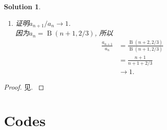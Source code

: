 \documentclass[a4paper, 12pt]{ctexart}
\theoremstyle{plain}
\theoremstyle{plain}
\theoremstyle{plain}
\theoremstyle{nonumberplain}
\newtheorem{proof}{Proof}
\newtheorem{solution}{Solution}
\DeclareMathOperator{\Beta}{B}
\DeclareMathOperator{\diff}{d}
\begin{document}
\begin{solution}
\begin{enumerate}[Step i.]
            故
            \begin{equation}
            \begin{aligned}
                a_n-b_n
                &=(L)\int_{0}^{\delta}{f_n(x)\diff x}\\
                &\leq (L)\int_{0}^{\delta}{f_n(\delta)\diff x}\\
                &= (R)\int_{0}^{\delta}{f_n(\delta)\diff x}\\
                &=\frac{\delta^{n+1}}{\sqrt[3]{1-\delta}}.
            \end{aligned}
            \end{equation}

            根据式(\ref{angeq})有
            \begin{equation}
                \frac{a_n-b_n}{a_n}
                \leq\frac{\delta^{n+1}/(\sqrt[3]{1-\delta})}{3/(2(n+1))}
                \to 0
            \end{equation}

            即$b_n/a_n\to 1$.

            \item

            证明$a_{n+1}/a_n\to 1$.\\
            因为$a_n=\Beta(n+1, 2/3)$, 所以
            \begin{equation}
                \begin{aligned}
                    \frac{a_{n+1}}{a_n}
                    &= \frac{\Beta(n+2, 2/3)}{\Beta(n+1, 2/3)}\\
                    &= \frac{n+1}{n+1+2/3}\\
                    &\to 1.
                \end{aligned}
            \end{equation}
        \end{enumerate}
    \end{solution}

    \begin{proof}
        见\citep[P36]{rudin1976principles}.
        \citep[P34]{rudin1976principleschinese}
        \citep{rudin1976principleschinese2}
        \citep[ZBWDSB]{rudin1976principleschinese3}
    \end{proof}

    \section{Codes}
\end{document}
